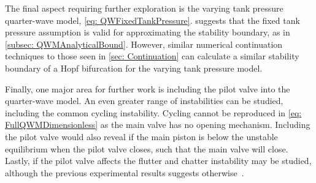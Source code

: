 The final aspect requiring further exploration is the varying tank pressure quarter-wave model, \cref{eq: QWFixedTankPressure}.  suggests that the fixed tank pressure assumption is valid for approximating the stability boundary, as in \cref{subsec: QWMAnalyticalBound}. However, similar numerical continuation techniques to those seen in \cref{sec: Continuation} can calculate a similar stability boundary of a Hopf bifurcation for the varying tank pressure model. %

Finally, one major area for further work is including the pilot valve into the quarter-wave model. An even greater range of instabilities can be studied, including the common cycling instability. Cycling cannot be reproduced in \cref{eq: FullQWMDimensionless} as the main valve has no opening mechanism. Including the pilot valve would also reveal if the main piston is below the unstable equilibrium when the pilot valve closes, such that the main valve will close. Lastly, if the pilot valve affects the flutter and chatter instability may be studied, although the previous experimental results suggests otherwise~\cite{Allison2015TestingValves}.
% 
% 
% 